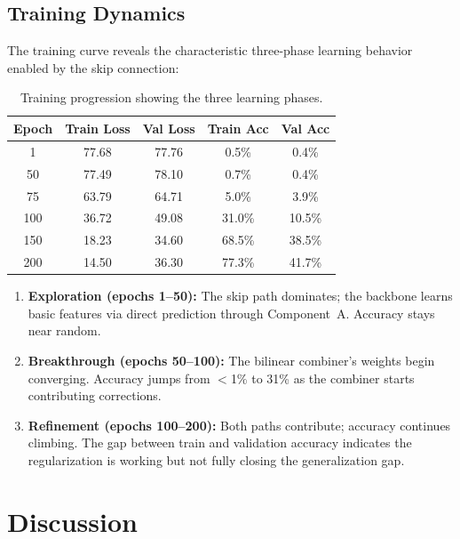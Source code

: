 \documentclass[submission]{iacrtrans}
\begin{document}
\subsection{Training Dynamics}

The training curve reveals the characteristic three-phase learning behavior enabled by the skip connection:

\begin{table}[t]
  \centering
  \caption{Training progression showing the three learning phases.}
  \label{tab:training}
  \begin{tabular}{ccccc}
    \toprule
    \textbf{Epoch} & \textbf{Train Loss} & \textbf{Val Loss} & \textbf{Train Acc} & \textbf{Val Acc} \\
    \midrule
    1   & 77.68 & 77.76 & 0.5\% & 0.4\% \\
    50  & 77.49 & 78.10 & 0.7\% & 0.4\% \\
    75  & 63.79 & 64.71 & 5.0\% & 3.9\% \\
    100 & 36.72 & 49.08 & 31.0\% & 10.5\% \\
    150 & 18.23 & 34.60 & 68.5\% & 38.5\% \\
    200 & 14.50 & 36.30 & 77.3\% & 41.7\% \\
    \bottomrule
  \end{tabular}
\end{table}

\begin{enumerate}[leftmargin=*]
  \item \textbf{Exploration (epochs 1--50):} The skip path dominates; the backbone learns basic features via direct prediction through Component~A. Accuracy stays near random.
  \item \textbf{Breakthrough (epochs 50--100):} The bilinear combiner's weights begin converging. Accuracy jumps from $<$1\% to 31\% as the combiner starts contributing corrections.
  \item \textbf{Refinement (epochs 100--200):} Both paths contribute; accuracy continues climbing. The gap between train and validation accuracy indicates the regularization is working but not fully closing the generalization gap.
\end{enumerate}


\section{Discussion}\label{sec:discussion}
\end{document}
